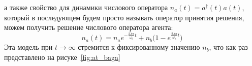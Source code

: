 а также свойство для динамики числового оператора $n_{a}(t) = a^{\dagger}(t) a(t)$, который в последующем
будем просто называть оператор принятия решения, можем получить решение числового оператора агента:
\begin{equation}\label{na_bagarello}
    n_{a}(t) = n_{a} e^{- \frac{2 \lambda \pi}{\omega_{b}} t} + n_{b} \Biggl( 1 - e^{\frac{2 \lambda \pi}{\omega_{b}} t} \Biggr)
\end{equation}
Эта модель при $ t \rightarrow \infty$ стремится к фиксированному значению $n_{b}$, что как раз
представлено на рисуке~\ref{fig:at_baga}
